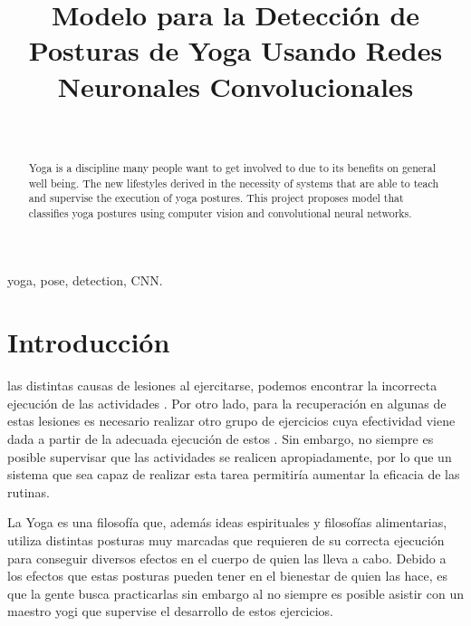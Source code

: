 \documentclass[journal]{IEEEtran}
\begin{document}
\title{Modelo para la Detección de Posturas de Yoga Usando Redes Neuronales Convolucionales}

\author{\\
}

\maketitle

\begin{abstract}
Yoga is a discipline many people want to get involved to due to its benefits on general well being. The new lifestyles derived in the necessity of systems that are able to teach and supervise the execution of yoga postures. This project proposes model that classifies yoga postures using computer vision and convolutional neural networks. 
\end{abstract}

\begin{IEEEkeywords}
yoga, pose, detection, CNN.
\end{IEEEkeywords}

\section{Introducción}

 las distintas causas de lesiones al ejercitarse, podemos encontrar la incorrecta ejecución de las actividades \cite{10.1145/3010915.3010941}. Por otro lado, para la recuperación en algunas de estas lesiones es necesario realizar otro grupo de ejercicios cuya efectividad viene dada a partir de la adecuada ejecución de estos \cite{10.1145/2856767.2856773}. Sin embargo, no siempre es posible supervisar que las actividades se realicen apropiadamente, por lo que un sistema que sea capaz de realizar esta tarea permitiría aumentar la eficacia de las rutinas.

La Yoga es una filosofía que, además ideas espirituales y filosofías alimentarias, utiliza distintas posturas muy marcadas que requieren de su correcta ejecución para conseguir diversos efectos en el cuerpo de quien las lleva a cabo. Debido a los efectos que estas posturas pueden tener en el bienestar de quien las hace, es que la gente busca practicarlas sin embargo al no siempre es posible asistir con un maestro yogi que supervise el desarrollo de estos ejercicios.
\end{document}
